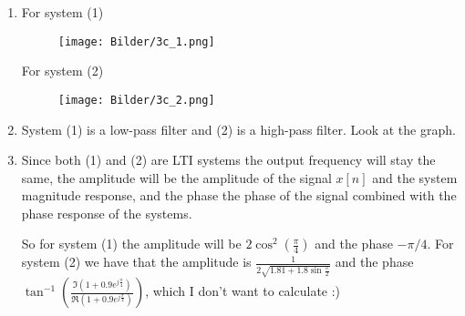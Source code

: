 \documentclass[a4paper,11pt,norsk]{article}
\begin{document}
\begin{enumerate}
    \item For system (1)
        \begin{figure}[H]
            \center
            \texttt{[image: Bilder/3c\_1.png]}
        \end{figure}
        For system (2)
        \begin{figure}[H]
            \center
            \texttt{[image: Bilder/3c\_2.png]}
        \end{figure}

    \item System (1) is a low-pass filter and (2) is a high-pass filter. Look at the graph.

    \item Since both (1) and (2) are LTI systems the output frequency will stay the same, the amplitude will be the amplitude of the 
        signal $x[n]$ and the system magnitude response, and the phase the phase of the signal combined with the phase response of the systems.

        So for system (1) the amplitude will be $2 \cos^2(\frac{\pi}{4})$ and the phase $-\pi/4$. For system (2) we have that 
        the amplitude is $\frac{1}{2\sqrt{1.81 + 1.8\sin \frac{\pi}{2}}}$ and the phase $\tan^{-1}\left(\frac{\Im(1 + 0.9e^{j\frac{\pi}{4}})}{\Re(1 + 0.9e^{j\frac{\pi}{4}})}\right)$, which I don't want to calculate :)
\end{enumerate}
\end{document}
